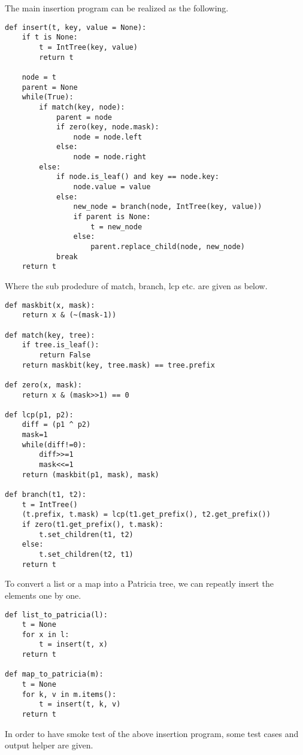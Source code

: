 \documentclass{article}
\begin{document}
The main insertion program can be realized as the following.

\begin{lstlisting}
def insert(t, key, value = None):
    if t is None:
        t = IntTree(key, value)
        return t

    node = t
    parent = None
    while(True):
        if match(key, node):
            parent = node
            if zero(key, node.mask):
                node = node.left
            else:
                node = node.right
        else:
            if node.is_leaf() and key == node.key:
                node.value = value
            else:
                new_node = branch(node, IntTree(key, value))
                if parent is None:
                    t = new_node
                else:
                    parent.replace_child(node, new_node)
            break
    return t
\end{lstlisting}

Where the sub prodedure of match, branch, lcp etc. are given as below.

\begin{lstlisting}
def maskbit(x, mask):
    return x & (~(mask-1))

def match(key, tree):
    if tree.is_leaf():
        return False
    return maskbit(key, tree.mask) == tree.prefix

def zero(x, mask):
    return x & (mask>>1) == 0

def lcp(p1, p2):
    diff = (p1 ^ p2)
    mask=1
    while(diff!=0):
        diff>>=1
        mask<<=1
    return (maskbit(p1, mask), mask)

def branch(t1, t2):
    t = IntTree()
    (t.prefix, t.mask) = lcp(t1.get_prefix(), t2.get_prefix())
    if zero(t1.get_prefix(), t.mask):
        t.set_children(t1, t2)
    else:
        t.set_children(t2, t1)
    return t
\end{lstlisting}

To convert a list or a map into a Patricia tree, we can repeatly
insert the elements one by one.

\begin{lstlisting}
def list_to_patricia(l):
    t = None
    for x in l:
        t = insert(t, x)
    return t

def map_to_patricia(m):
    t = None
    for k, v in m.items():
        t = insert(t, k, v)
    return t
\end{lstlisting}

In order to have smoke test of the above insertion program, some test
cases and output helper are given.
\end{document}
